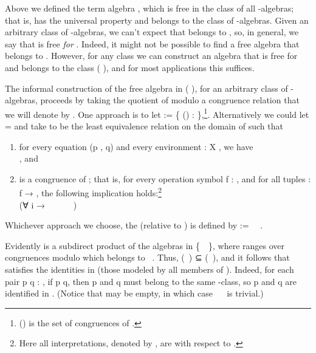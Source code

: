 Above we defined the term algebra , which is free in the class of all
-algebras; that is,  has the universal property and belongs to the class of
-algebras.  Given an arbitrary class  of -algebras, we can't expect that
 belongs to , so, in general, we say that  is free \emph{for} .
\ifshort\else
Indeed, it might not be possible to find a free algebra that belongs to .
\fi
However, for any class  we can construct an algebra that is free for 
and belongs to the class  ( ), and for most applications this suffices.

The informal construction of the free algebra in  ( ), for an arbitrary
class  of -algebras, proceeds by taking the quotient of  modulo a congruence relation
that we will denote by .  One approach is to let
 := \{   () :  \af{/}   
\},\footnote{ () is the set of congruences of .}.
Alternatively we could let  =   and take  to be the least equivalence relation
on the domain of  such that
\begin{enumerate}
\item for every equation (\ab p , \ab q)    and every
environment  : \ab X  , we have\\
      , and
\item {} is a congruence of ; that is, for every operation symbol \ab
f : , and for all tuples   :  \ab f
→ , the following implication holds:\footnote{Here all
interpretations, denoted by , are with respect to .}\\[-8pt]

(∀ i → ~~~~~~)
 ~~~~~~\\[-4pt]
\end{enumerate}
Whichever approach we choose, the   (relative to ) is defined by  := ~\af{/}~. %

Evidently  is a subdirect product of the algebras in \{~\af{/}~\},
where  ranges over congruences modulo which  belongs to ~.
Thus,   (~) ⊆ (~), and it follows
that  satisfies the identities in   (those modeled by all members of
).  Indeed, for each pair \ab p \ab q : , if   \ab p  \ab
q, then \ab p and \ab q must belong to the same -class, so \ab p and \ab q are
identified in . \ifshort\else (Notice that  may be empty, in which case
~\af{/}~ is trivial.) \fi

